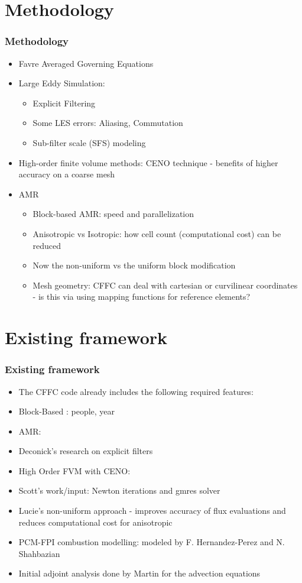 \documentclass{beamer}
\begin{document}
\section[Methodology]{Methodology}
\begin{frame}[allowframebreaks]
\frametitle{Methodology}
\begin{itemize}
\item Favre Averaged Governing Equations
\item Large Eddy Simulation:
  \begin{itemize}
   \item Explicit Filtering
   \item Some LES errors: Aliasing, Commutation
   \item Sub-filter scale (SFS) modeling
  \end{itemize}
\item High-order finite volume methods: CENO technique - benefits of higher accuracy on a coarse mesh
\item AMR
   \begin{itemize}
   \item Block-based AMR: speed and parallelization
   \item Anisotropic vs Isotropic: how cell count (computational cost) can be reduced
   \item Now the non-uniform vs the uniform block modification
   \item Mesh geometry: CFFC can deal with cartesian or curvilinear coordinates - is this via using mapping functions for reference elements?
   \end{itemize}
\end{itemize}
\end{frame}

\section[Framework]{Existing framework}
\begin{frame}[allowframebreaks]
\frametitle{Existing framework}
\begin{itemize}
\item The CFFC code already includes the following required features:
\item Block-Based : people, year
\item AMR:
\item Deconick's research on explicit filters
\item High Order FVM with CENO:
\item Scott's work/input: Newton iterations and gmres solver
\item Lucie's non-uniform approach - improves accuracy of flux evaluations and reduces computational cost for anisotropic
\item PCM-FPI combustion modelling: modeled by F. Hernandez-Perez and N. Shahbazian
\item Initial adjoint analysis done by Martin for the advection equations
\end{itemize}
\end{frame}
\end{document}

